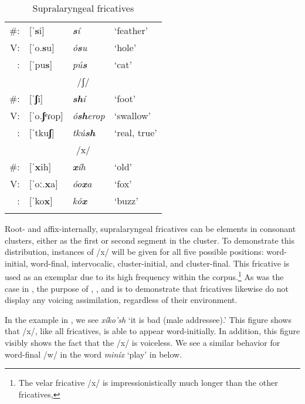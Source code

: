 \begin{table}
\caption{Supralaryngeal fricatives}\label{suprafrictable}
\begin{tabular}{rlll}
\lsptoprule
                   \multicolumn{4}{c}{/s/}                      \\
\midrule
{\#{\longrule}}: & [ˈ\textbf{s}i] &\textit{\textbf{s}í} &`feather'\\
V{\longrule}:   & [ˈo.\textbf{s}u] &\textit{ó\textbf{s}u} &`hole'      \\
{\longrule}:    & [ˈpu\textbf{s}] &\textit{pú\textbf{s}} &`cat'\\
\midrule
                   \multicolumn{4}{c}{/ʃ/}                      \\
\midrule
{\#{\longrule}}: & [ˈ\textbf{ʃ}i] &\textit{\textbf{sh}í} &`foot'\\
V{\longrule}:   & [ˈo.\textbf{ʃ}ᵉɾop] &\textit{ó\textbf{sh}erop} &`swallow'\\
{\longrule}:    & [ˈtku\textbf{ʃ}] &\textit{tkú\textbf{sh}} &`real, true'\\
\midrule
                   \multicolumn{4}{c}{/x/}                      \\
\midrule
{\#{\longrule}}: & [ˈ\textbf{x}ih] &\textit{\textbf{x}íh} &`old'\\
V{\longrule}:   & [ˈoː.\textbf{x}a] &\textit{óo\textbf{x}a} &`fox'\\
{\longrule}:    & [ˈko\textbf{x}] &\textit{kó\textbf{x}} &`buzz'\\
\lspbottomrule
\end{tabular}
\end{table}

Root- and affix-internally, supralaryngeal fricatives can be elements in consonant clusters, either as the first or second segment in the cluster. To demonstrate this distribution, instances of /x/ will be given for all five possible positions: word-initial, word-final, intervocalic, cluster-initial, and cluster-final. This fricative is used as an exemplar due to its high frequency within the corpus.\footnote{The velar fricative /x/ is impressionistically much longer than the other fricatives, } As was the case in , the purpose of , , and   is to demonstrate that fricatives likewise do not display any voicing assimilation, regardless of their environment.

In the example in , we see \textit{xíko'sh} `it is bad (male addressee).' This figure shows that /x/, like all fricatives, is able to appear word-initially. In addition, this figure visibly shows the fact that the /x/ is voiceless. We see a similar behavior for word-final /w/ in the word \textit{miníx} `play' in  below.


